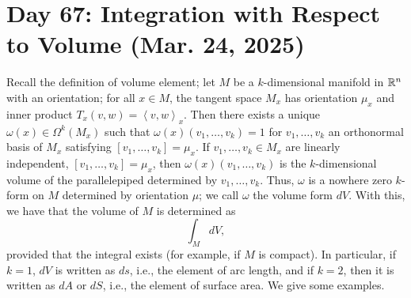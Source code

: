 \section{Day 67: Integration with Respect to Volume (Mar. 24, 2025)}
Recall the definition of volume element; let $M$ be a $k$-dimensional manifold in $\mathbb R^n$ with an orientation; for all $x \in M$, the tangent space $M_x$ has orientation $\mu_x$ and inner product $T_x(v, w) = \left<v, w\right>_x$. Then there exists a unique $\omega(x) \in \Omega^k(M_x)$ such that $\omega(x)(v_1, \dots, v_k) = 1$ for $v_1, \dots, v_k$ an orthonormal basis of $M_x$ satisfying $[v_1, \dots, v_k] = \mu_x$.
\medskip\newline
If $v_1, \dots, v_k \in M_x$ are linearly independent, $[v_1, \dots, v_k] = \mu_x$, then $\omega(x)(v_1, \dots, v_k)$ is the $k$-dimensional volume of the parallelepiped determined by $v_1, \dots, v_k$. Thus, $\omega$ is a nowhere zero $k$-form on $M$ determined by orientation $\mu$; we call $\omega$ the volume form $dV$. With this, we have that the volume of $M$ is determined as
\[ \int_M dV, \]
provided that the integral exists (for example, if $M$ is compact). In particular, if $k = 1$, $dV$ is written as $ds$, i.e., the element of arc length, and if $k = 2$, then it is written as $dA$ or $dS$, i.e., the element of surface area. We give some examples.
